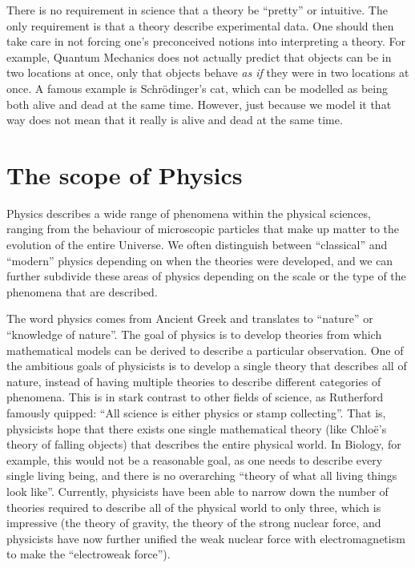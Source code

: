 There is no requirement in science that a theory be ``pretty'' or intuitive. The only requirement is that a theory describe experimental data. One should then take care in not forcing one's preconceived notions into interpreting a theory. For example, Quantum Mechanics does not actually predict that objects can be in two locations at once, only that objects behave \textit{as if} they were in two locations at once. A famous example is Schr\"odinger's cat, which can be modelled as being both alive and dead at the same time. However, just because we model it that way does not mean that it really is alive and dead at the same time. 

\section{The scope of Physics}
Physics describes a wide range of phenomena within the physical sciences, ranging from the behaviour of microscopic particles that make up matter to the evolution of the entire Universe. We often distinguish between ``classical'' and ``modern'' physics depending on when the theories were developed, and we can further subdivide these areas of physics depending on the scale or the type of the phenomena that are described.

The word physics comes from Ancient Greek and translates to ``nature'' or ``knowledge of nature''. The goal of physics is to develop theories from which mathematical models can be derived to describe a particular observation. One of the ambitious goals of physicists is to develop a single theory that describes all of nature, instead of having multiple theories to describe different categories of phenomena. This is in stark contrast to other fields of science, as Rutherford famously quipped: ``All science is either physics or stamp collecting''. That is, physicists hope that there exists one single mathematical theory (like Chlo\"e's theory of falling objects) that describes the entire physical world. In Biology, for example, this would not be a reasonable goal, as one needs to describe every single living being, and there is no overarching ``theory of what all living things look like''. Currently, physicists have been able to narrow down the number of theories required to describe all of the physical world to only three, which is impressive (the theory of gravity, the theory of the strong nuclear force, and physicists have now further unified the weak nuclear force with electromagnetism to make the ``electroweak force'').


